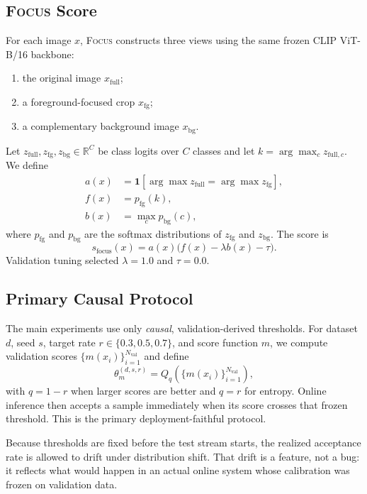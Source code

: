 \documentclass{article}
\newcommand{\focus}{\textsc{Focus}}
\newcommand{\scorefocus}{s_{\mathrm{focus}}}
\begin{document}
\subsection{\focus{} Score}

For each image $x$, \focus{} constructs three views using the same frozen CLIP ViT-B/16 backbone:
\begin{enumerate}
    \item the original image $x_{\mathrm{full}}$;
    \item a foreground-focused crop $x_{\mathrm{fg}}$;
    \item a complementary background image $x_{\mathrm{bg}}$.
\end{enumerate}
Let $z_{\mathrm{full}}, z_{\mathrm{fg}}, z_{\mathrm{bg}} \in \mathbb{R}^C$ be class logits over $C$ classes and let $k = \arg\max_c z_{\mathrm{full},c}$. We define
\begin{align}
a(x) &= \mathbf{1}\!\left[\arg\max z_{\mathrm{full}} = \arg\max z_{\mathrm{fg}}\right], \\
f(x) &= p_{\mathrm{fg}}(k), \\
b(x) &= \max_c p_{\mathrm{bg}}(c),
\end{align}
where $p_{\mathrm{fg}}$ and $p_{\mathrm{bg}}$ are the softmax distributions of $z_{\mathrm{fg}}$ and $z_{\mathrm{bg}}$. The score is
\begin{equation}
\scorefocus(x) = a(x)\big(f(x) - \lambda b(x) - \tau\big).
\end{equation}
Validation tuning selected $\lambda = 1.0$ and $\tau = 0.0$.

\subsection{Primary Causal Protocol}

The main experiments use only \emph{causal}, validation-derived thresholds. For dataset $d$, seed $s$, target rate $r \in \{0.3, 0.5, 0.7\}$, and score function $m$, we compute validation scores $\{m(x_i)\}_{i=1}^{N_{\mathrm{val}}}$ and define
\begin{equation}
\theta^{(d,s,r)}_m = Q_q\!\left(\{m(x_i)\}_{i=1}^{N_{\mathrm{val}}}\right),
\end{equation}
with $q=1-r$ when larger scores are better and $q=r$ for entropy. Online inference then accepts a sample immediately when its score crosses that frozen threshold. This is the primary deployment-faithful protocol.

Because thresholds are fixed before the test stream starts, the realized acceptance rate is allowed to drift under distribution shift. That drift is a feature, not a bug: it reflects what would happen in an actual online system whose calibration was frozen on validation data.
\end{document}
